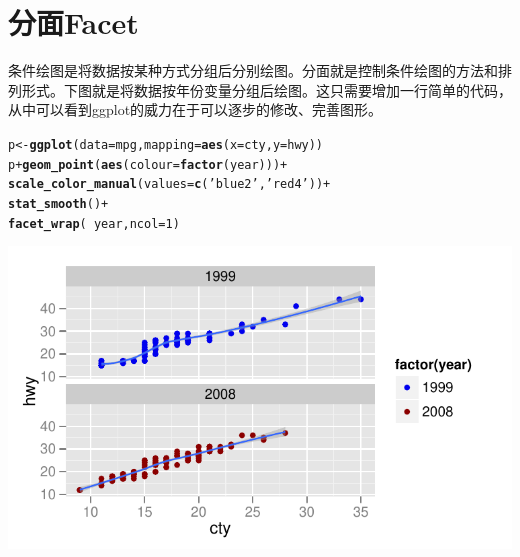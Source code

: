 \documentclass[UTF8,10pt]{ctexart}\usepackage{graphicx, color}
\makeatletter
\def\maxwidth{ %
  \ifdim\Gin@nat@width>\linewidth
    \linewidth
  \else
    \Gin@nat@width
  \fi
}
\newcommand{\hlfunctioncall}[1]{\textcolor[rgb]{0.501960784313725,0,0.329411764705882}{\textbf{#1}}}%
\newcommand{\hlstring}[1]{\textcolor[rgb]{0.6,0.6,1}{#1}}%
\newenvironment{kframe}{%
 \def\at@end@of@kframe{}%
 \ifinner\ifhmode%
  \def\at@end@of@kframe{\end{minipage}}%
  \begin{minipage}{\columnwidth}%
 \fi\fi%
 \def\FrameCommand##1{\hskip\@totalleftmargin \hskip-\fboxsep
 \colorbox{shadecolor}{##1}\hskip-\fboxsep
     \hskip-\linewidth \hskip-\@totalleftmargin \hskip\columnwidth}%
 \MakeFramed {\advance\hsize-\width
   \@totalleftmargin\z@ \linewidth\hsize
   \@setminipage}}%
 {\par\unskip\endMakeFramed%
 \at@end@of@kframe}
\newenvironment{knitrout}{}{} %
\makeatother
\begin{document}
\section{分面Facet}
条件绘图是将数据按某种方式分组后分别绘图。分面就是控制条件绘图的方法和排列形式。下图就是将数据按年份变量分组后绘图。这只需要增加一行简单的代码，从中可以看到ggplot的威力在于可以逐步的修改、完善图形。
\begin{knitrout}
\color{fgcolor}\begin{kframe}
\begin{alltt}
p <- \hlfunctioncall{ggplot}(data=mpg,mapping=\hlfunctioncall{aes}(x=cty,y=hwy))
p + \hlfunctioncall{geom_point}(\hlfunctioncall{aes}(colour=\hlfunctioncall{factor}(year)))+
    \hlfunctioncall{scale_color_manual}(values =\hlfunctioncall{c}(\hlstring{'blue2'},\hlstring{'red4'}))+
    \hlfunctioncall{stat_smooth}()+
    \hlfunctioncall{facet_wrap}(~ year,ncol=1)
\end{alltt}
\end{kframe}

{\centering \includegraphics[width=\maxwidth]{figure/unnamed-chunk-9} 

}


\end{knitrout}
\end{document}
